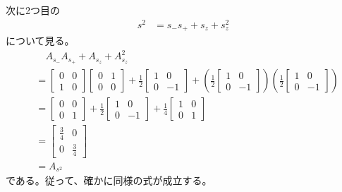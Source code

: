 次に2つ目の
\begin{align}
	s^2
&=
	s_- s_+
	+
	s_z
	+
	s_z^2
\end{align}
について見る。
\begin{align}
&\quad
	A_{s_-} A_{s_+}
	+
	A_{s_z}
	+
	A_{s_z}^2 \\
&=
	\left[
	\begin{array}{cc}
		0 & 0 \\
		1 & 0
	\end{array}
	\right]
	\left[
	\begin{array}{cc}
		0 & 1 \\
		0 & 0
	\end{array}
	\right]
	+
	\frac{1}{2}
	\left[
	\begin{array}{cc}
		1 & 0 \\
		0 & -1
	\end{array}
	\right]
	+
	\left(
		\frac{1}{2}
		\left[
		\begin{array}{cc}
			1 & 0 \\
			0 & -1
		\end{array}
		\right]
	\right)
	\left(
		\frac{1}{2}
		\left[
		\begin{array}{cc}
			1 & 0 \\
			0 & -1
		\end{array}
		\right]
	\right) \\
%
%
&=
	\left[
	\begin{array}{cc}
		0 & 0 \\
		0 & 1
	\end{array}
	\right]
	+
	\frac{1}{2}
	\left[
	\begin{array}{cc}
		1 & 0 \\
		0 & -1
	\end{array}
	\right]
	+
	\frac{1}{4}
	\left[
	\begin{array}{cc}
		1 & 0 \\
		0 & 1
	\end{array}
	\right] \\
%
%
&=
	\left[
	\begin{array}{cc}
		\frac{3}{4} & 0 \\[2mm]
		0 & \frac{3}{4}
	\end{array}
	\right] \\
%
%
&=
	A_{s^2}
\end{align}
である。従って、確かに同様の式が成立する。





